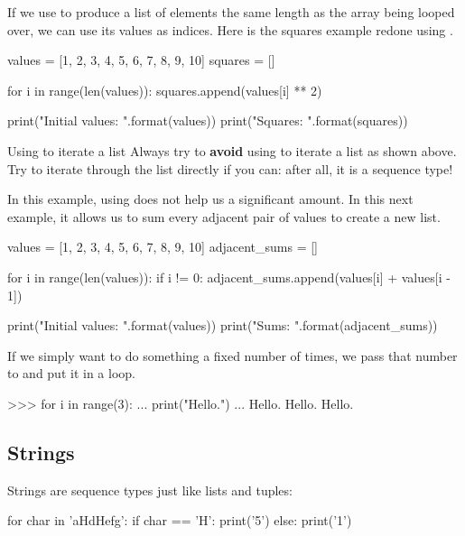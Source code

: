 \documentclass[11pt]{cselabheader}
\begin{document}
If we use  to produce a list of elements the same length as
the array being looped over, we can use its values as indices. Here is the
squares example redone using .

\begin{python3code}
values = [1, 2, 3, 4, 5, 6, 7, 8, 9, 10]
squares = []

for i in range(len(values)):
    squares.append(values[i] ** 2)

print("Initial values: {}".format(values))
print("Squares: {}".format(squares))
\end{python3code}

\begin{warningbox}{Using  to iterate a list}
  Always try to \textbf{avoid} using  to iterate a list as
  shown above. Try to iterate through the list directly if you can: after all,
  it is a sequence type!
\end{warningbox}

In this example, using  does not help us a significant
amount. In this next example, it allows us to sum every adjacent pair of values
to create a new list.

\begin{python3code}
values = [1, 2, 3, 4, 5, 6, 7, 8, 9, 10]
adjacent_sums = []

for i in range(len(values)):
    if i != 0:
        adjacent_sums.append(values[i] + values[i - 1])

print("Initial values: {}".format(values))
print("Sums: {}".format(adjacent_sums))
\end{python3code}

If we simply want to do something a fixed number of times, we pass that number
to  and put it in a loop.

\begin{pyconcode}
>>> for i in range(3):
...     print("Hello.")
...
Hello.
Hello.
Hello.
\end{pyconcode}

\subsection{Strings}

Strings are sequence types just like lists and tuples:

\begin{python3code}
for char in 'aHdHefg':
    if char == 'H':
        print('5')
    else:
        print('1')
\end{python3code}
\end{document}
